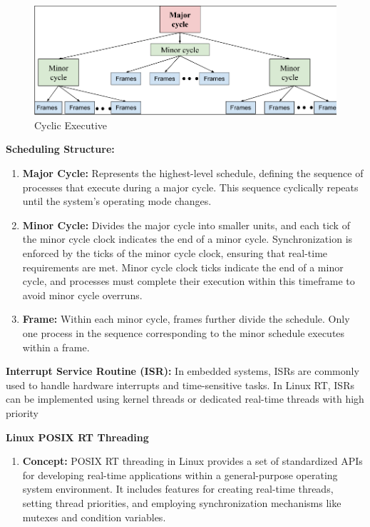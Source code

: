 \documentclass[a4paper,11pt]{article}%
\newenvironment{qanda}{\setlength{\parindent}{0pt}}{\bigskip}
\begin{document}
\begin{qanda}
\begin{enumerate}
\begin{enumerate}
					\begin{figure}[H]
						\centering
						\includegraphics[scale=0.7]{figures/ce.png}
						\caption{Cyclic Executive}
					\end{figure}

					\textbf{Scheduling Structure:}
					\begin{enumerate}
						\item \textbf{Major Cycle:} Represents the highest-level schedule, defining the sequence of processes that execute during a major cycle. This sequence cyclically repeats until the system's operating mode changes.
						\item \textbf{Minor Cycle:} Divides the major cycle into smaller units, and each tick of the minor cycle clock indicates the end of a minor cycle. Synchronization is enforced by the ticks of the minor cycle clock, ensuring that real-time requirements are met. Minor cycle clock ticks indicate the end of a minor cycle, and processes must complete their execution within this timeframe to avoid minor cycle overruns.
						\item \textbf{Frame:} Within each minor cycle, frames further divide the schedule. Only one process in the sequence	corresponding to the minor schedule executes within a frame.
					\end{enumerate}



			\end{enumerate}


			\textbf{Interrupt Service Routine (ISR):}
			In embedded systems, ISRs are commonly used to handle hardware interrupts and time-sensitive tasks.
			In Linux RT, ISRs can be implemented using kernel threads or dedicated real-time threads with high priority

			\textbf{Linux POSIX RT Threading}
			\begin{enumerate}
				\item[] \textbf{Concept:} POSIX RT threading in Linux provides a set of standardized APIs for developing real-time applications within a general-purpose operating system environment. It includes features for creating real-time threads, setting thread priorities, and employing synchronization mechanisms like mutexes and condition variables.


\end{enumerate}
\end{enumerate}
\end{qanda}
\end{document}
